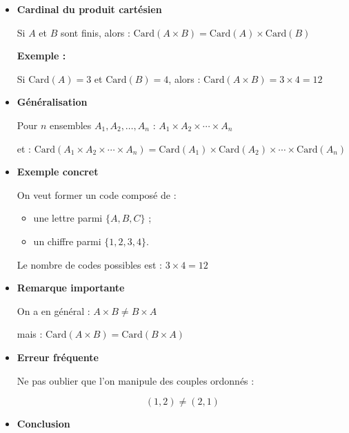\documentclass[12pt,a4paper]{article}
\begin{document}
\begin{enumerate}[label=\Roman*., font=\bfseries\color{red}]
\begin{enumerate}
\begin{itemize}
Ce type de situation apparaît lorsqu’on effectue des choix successifs :
\begin{itemize}
    \item choix d’un vêtement et d’une couleur ;
    \item choix d’un nombre et d’une lettre ;
    \item choix d’un menu (entrée, plat).
\end{itemize}

\item \textbf{Cardinal du produit cartésien}

Si \( A \) et \( B \) sont finis, alors :
\(
\mathrm{Card}(A \times B) = \mathrm{Card}(A) \times \mathrm{Card}(B)
\)

\textbf{Exemple :}

Si \( \mathrm{Card}(A) = 3 \) et \( \mathrm{Card}(B) = 4 \), alors :
\(
\mathrm{Card}(A \times B) = 3 \times 4 = 12
\)

\item \textbf{Généralisation}  

Pour \( n \) ensembles \( A_1, A_2, \dots, A_n \) :
\(
A_1 \times A_2 \times \cdots \times A_n
\)

et :
\(
\mathrm{Card}(A_1 \times A_2 \times \cdots \times A_n)
= \mathrm{Card}(A_1)\times \mathrm{Card}(A_2)\times \cdots \times \mathrm{Card}(A_n)
\)

\item \textbf{Exemple concret} 

On veut former un code composé de :
\begin{itemize}
    \item une lettre parmi \( \{A,B,C\} \) ;
    \item un chiffre parmi \( \{1,2,3,4\} \).
\end{itemize}

Le nombre de codes possibles est :
\(
3 \times 4 = 12
\)

\item \textbf{Remarque importante} 

On a en général :
\(
A \times B \neq B \times A
\)

mais :
\(
\mathrm{Card}(A \times B) = \mathrm{Card}(B \times A)
\)

\item \textbf{Erreur fréquente} 

Ne pas oublier que l’on manipule des couples ordonnés :

\[
(1,2) \neq (2,1)
\]

\item \textbf{Conclusion} 


\end{itemize}
\end{enumerate}
\end{enumerate}
\end{document}
